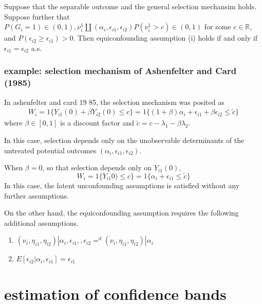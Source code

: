 \documentclass[uplatex,dvipdfmx]{jsarticle}
\begin{document}
\begin{theorem}
    Suppose that the separable outcome and the general selection mechansim holds. Suppose further that $P(G_i = 1) \in (0,1) , \nu_i^1 \amalg ( \alpha_i , \epsilon_{i1}, \epsilon_{i2} ) P( \nu_i^1 > c) \in (0,1) $ for some $c\in \mathbb{R}$, and $P (\epsilon_{i2} \geq \epsilon_{i1} ) > 0$.
    Then equiconfounding assumption (i) holds if and only if $\epsilon_{i1} = \epsilon_{i2}$ a.s.
\end{theorem}


\subsubsection{example: selection mechanism of Ashenfelter and Card (1985)}
In %
{ashenfelter and card 19 85}, the selection mechanism was posited as 
\begin{align*}
    W_i = 1\{ Y_{i1}(0) + \beta Y_{i2} ( 0) \leq c \} =  1 \{  (1 + \beta ) \alpha_i + \epsilon_{i1} + \beta \epsilon_{i2} \leq \tilde{c} \}
\end{align*}
where $\beta\in[0,1]$ is a discount factor and $\tilde{c} = c - \lambda_1 - \beta \lambda_2$.

In this case, selection depends only on the unobservable determinants of the untreated potential outcomes $( \alpha_i , \epsilon_{i1}, \epsilon_{i2} ) $.

When $\beta = 0 $, so that selection depends only on $Y_{i1} (0) $, 
\begin{equation}
    W_i = 1 \{ Y_{i1}0) \leq c \} = 1 \{ \alpha_i  + \epsilon_{i1} \leq \tilde{c} \}
\end{equation}
In this case, the latent unconfounding assumptions is satisfied without any further assumptions. 

On the other hand,  the equiconfounding assumption requires the following additional assumptions.
\begin{enumerate}
    \item $ ( \nu_i, \eta_{i1} , \eta_{i2} ) | \alpha_i , \epsilon_{i1}, , \epsilon_{i2} =^d ( \nu_i , \eta_{i1}, \eta_{i2} ) | \alpha_i$
    \item $ E [ \epsilon_{i2} | \alpha_i , \epsilon_{i1} ] = \epsilon_{i1}$
\end{enumerate}

\section{estimation of confidence bands}
\end{document}
